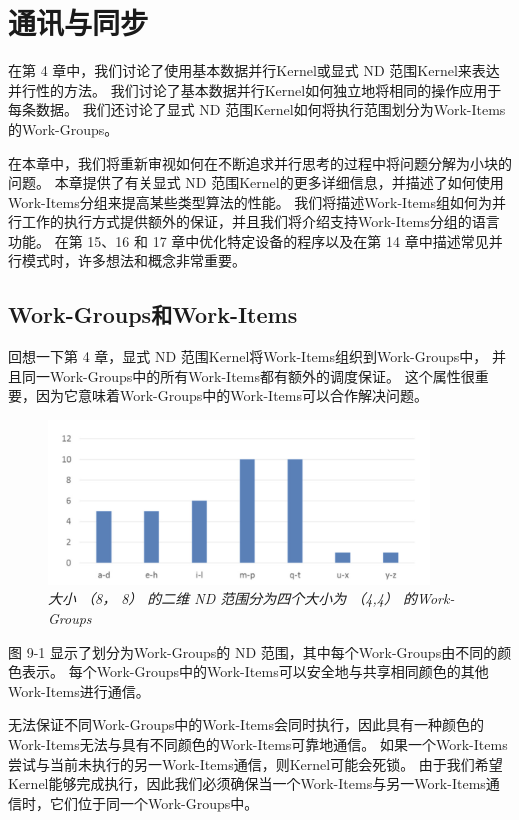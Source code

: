 \section{通讯与同步}
在第 4 章中，我们讨论了使用基本数据并行Kernel或显式 ND 范围Kernel来表达并行性的方法。 
我们讨论了基本数据并行Kernel如何独立地将相同的操作应用于每条数据。 
我们还讨论了显式 ND 范围Kernel如何将执行范围划分为Work-Items的Work-Groups。

在本章中，我们将重新审视如何在不断追求并行思考的过程中将问题分解为小块的问题。 
本章提供了有关显式 ND 范围Kernel的更多详细信息，并描述了如何使用Work-Items分组来提高某些类型算法的性能。 
我们将描述Work-Items组如何为并行工作的执行方式提供额外的保证，并且我们将介绍支持Work-Items分组的语言功能。 
在第 15、16 和 17 章中优化特定设备的程序以及在第 14 章中描述常见并行模式时，许多想法和概念非常重要。

\subsection{Work-Groups和Work-Items}
回想一下第 4 章，显式 ND 范围Kernel将Work-Items组织到Work-Groups中，
并且同一Work-Groups中的所有Work-Items都有额外的调度保证。 
这个属性很重要，因为它意味着Work-Groups中的Work-Items可以合作解决问题。

\begin{figure}[H]
	\centering
	\includegraphics[width=0.9\textwidth]{figs/F9.1.png}
	\caption{\textit{大小 （8， 8） 的二维 ND 范围分为四个大小为 （4,4） 的Work-Groups }}
\end{figure}

图 9-1 显示了划分为Work-Groups的 ND 范围，其中每个Work-Groups由不同的颜色表示。 
每个Work-Groups中的Work-Items可以安全地与共享相同颜色的其他Work-Items进行通信。

无法保证不同Work-Groups中的Work-Items会同时执行，因此具有一种颜色的Work-Items无法与具有不同颜色的Work-Items可靠地通信。 
如果一个Work-Items尝试与当前未执行的另一Work-Items通信，则Kernel可能会死锁。 
由于我们希望Kernel能够完成执行，因此我们必须确保当一个Work-Items与另一Work-Items通信时，它们位于同一个Work-Groups中。

